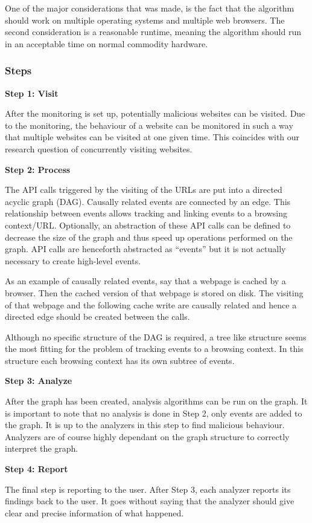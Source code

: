 One of the major considerations that was made, is the fact that the algorithm should work on multiple operating systems and multiple web browsers. The second consideration is a reasonable runtime, meaning the algorithm should run in an acceptable time on normal commodity hardware.

\subsubsection{Steps}

\textbf{Step 1: Visit}

After the monitoring is set up, potentially malicious websites can be visited. Due to the monitoring, the behaviour of a website can be monitored in such a way that multiple websites can be visited at one given time. This coincides with our research question of concurrently visiting websites.


\textbf{Step 2: Process}
\label{sec:algos2}

The API calls triggered by the visiting of the URLs are put into a directed acyclic graph (DAG). Causally related events are connected by an edge. This relationship between events allows tracking and linking events to a browsing context/URL. Optionally, an abstraction of these API calls can be defined to decrease the size of the graph and thus speed up operations performed on the graph. API calls are henceforth abstracted as ``events'' but it is not actually necessary to create high-level events.

As an example of causally related events, say that a webpage is cached by a browser. Then the cached version of that webpage is stored on disk. The visiting of that webpage and the following cache write are causally related and hence a directed edge should be created between the calls.

Although no specific structure of the DAG is required, a tree like structure seems the most fitting for the problem of tracking events to a browsing context. In this structure each browsing context has its own subtree of events. 

\textbf{Step 3: Analyze}

After the graph has been created, analysis algorithms can be run on the graph. It is important to note that no analysis is done in Step 2, only events are added to the graph. It is up to the analyzers in this step to find malicious behaviour. Analyzers are of course highly dependant on the graph structure to correctly interpret the graph.

\textbf{Step 4: Report}

The final step is reporting to the user. After Step 3, each analyzer reports its findings back to the user. It goes without saying that the analyzer should give clear and precise information of what happened.
